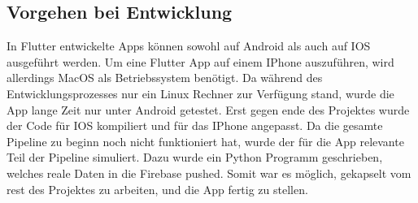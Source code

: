 \subsection{Vorgehen bei Entwicklung}
In Flutter entwickelte Apps können sowohl auf Android als auch auf IOS ausgeführt werden. 
Um eine Flutter App auf einem IPhone auszuführen, wird allerdings MacOS als Betriebssystem benötigt. 
Da während des Entwicklungsprozesses nur ein Linux Rechner zur Verfügung stand, wurde die App lange Zeit nur unter
Android getestet. 
Erst gegen ende des Projektes wurde der Code für IOS kompiliert und für das IPhone angepasst.  
Da die gesamte Pipeline zu beginn noch nicht funktioniert hat, wurde der für die App relevante Teil der Pipeline simuliert.
Dazu wurde ein Python Programm geschrieben, welches reale Daten in die Firebase pushed. 
Somit war es möglich, gekapselt vom rest des Projektes zu arbeiten, und die App fertig zu stellen. 
 


    

